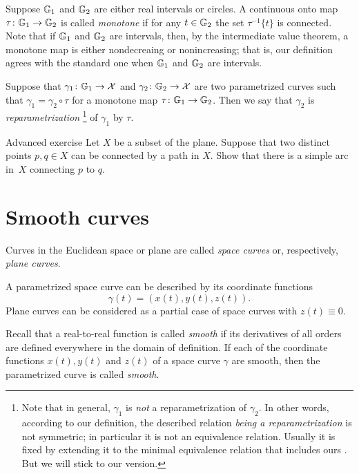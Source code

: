 Suppose $\mathbb{G}_1$ and $\mathbb{G}_2$ are either real intervals or circles.
A continuous onto map $\tau\colon\mathbb{G}_1\to\mathbb{G}_2$ is called \emph{monotone} if for any $t\in \mathbb{G}_2$ the set $\tau^{-1}\{t\}$ is connected.
Note that if $\mathbb{G}_1$ and $\mathbb{G}_2$ are intervals, then, by the intermediate value theorem, a monotone map is either nondecreaing or nonincreasing;
that is, our definition agrees with the standard one when $ \mathbb{G}_1 $ and $\mathbb{G}_2$ are intervals.

Suppose that $\gamma_1\colon\mathbb{G}_1\to \mathcal{X}$ and $\gamma_2\colon\mathbb{G}_2\to \mathcal{X}$ are two parametrized curves such that 
$\gamma_1=\gamma_2\circ\tau$ for a monotone map $\tau\colon\mathbb{G}_1\to\mathbb{G}_2$.
Then we say that $\gamma_2$ is \emph{reparametrization}%
\footnote{Note that in general, $\gamma_1$ is {}\emph{not} a reparametrization of $\gamma_2$.
In other words, according to our definition, the described relation {}\emph{being a reparametrization} is not symmetric;
in particular it is not an equivalence relation.
Usually it is fixed by extending it to the minimal equivalence relation that includes ours \cite[2.5.1]{burago-burago-ivanov}.
But we will stick to our version.}
of $\gamma_1$ by $\tau$.


\begin{thm}{Advanced exercise}\label{aex:simple-curve}
Let $X$ be a subset of the plane.
Suppose that two distinct points $p,q\in X$ can be connected by a path in $X$.
Show that there is a simple arc in~$X$ connecting $p$ to $q$.
\end{thm}

\section{Smooth curves}

Curves in the Euclidean space or plane are called \emph{space curves} or, respectively, \emph{plane curves}.

A parametrized space curve can be described by its coordinate functions 
\[\gamma(t)=(x(t),y(t),z(t)).\]
Plane curves can be considered as a partial case of space curves with $z(t)\equiv 0$.

Recall that a real-to-real function is called \emph{smooth} if its derivatives of all orders are defined everywhere in the domain of definition.  
If each of the coordinate functions $x(t), y(t)$ and $z(t)$ of a space curve $\gamma$ are smooth, then the parametrized curve is called \emph{smooth}.

